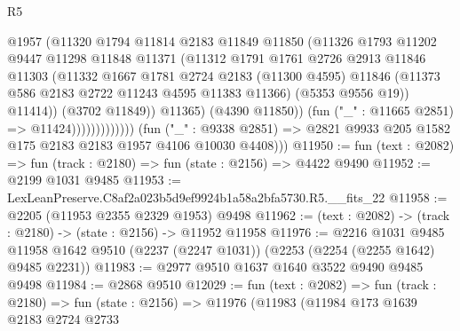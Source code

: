 \begin{lexlean}{R5}
\begin{coremodule}
                                    @1957
                                    (@11320
                                      @1794
                                      @11814
                                      @2183
                                      @11849
                                      @11850
                                      (@11326
                                        @1793
                                        @11202
                                        @9447
                                        @11298
                                        @11848
                                        @11371
                                        (@11312
                                          @1791
                                          @1761
                                          @2726
                                          @2913
                                          @11846
                                          @11303
                                          (@11332
                                            @1667
                                            @1781
                                            @2724
                                            @2183
                                            (@11300 @4595)
                                            @11846
                                            (@11373 @586 @2183 @2722 @11243 @4595 @11383 @11366)
                                            (@5353 @9556 @19))
                                          @11414))
                                      (@3702 @11849))
                                    @11365)
                                  (@4390 @11850))
                                (fun ("_" : @11665 @2851) => @11424)))))))))))))
        (fun ("_" : @9338 @2851) =>
        @2821 @9933 @205 @1582 @175 @2183 @2183 @1957 @4106 @10030 @4408)))
@11950 := fun (text : @2082) => fun (track : @2180) => fun (state : @2156) => @4422 @9490
@11952 := @2199 @1031 @9485
@11953 := LexLeanPreserve.C8af2a023b5d9ef9924b1a58a2bfa5730.R5.__fits_22
@11958 := @2205 (@11953 @2355 @2329 @1953) @9498
@11962 := (text : @2082) -> (track : @2180) -> (state : @2156) -> @11952 @11958
@11976 := @2216
    @1031
    @9485
    @11958
    @1642
    @9510
    (@2237 (@2247 @1031))
    (@2253 (@2254 (@2255 @1642) @9485 @2231))
@11983 := @2977 @9510 @1637 @1640 @3522 @9490 @9485 @9498
@11984 := @2868 @9510
@12029 := fun (text : @2082) =>
  fun (track : @2180) =>
  fun (state : @2156) =>
  @11976
    (@11983
      (@11984
        @173
        @1639
        @2183
        @2724
        @2733

\end{coremodule}
\end{lexlean}
